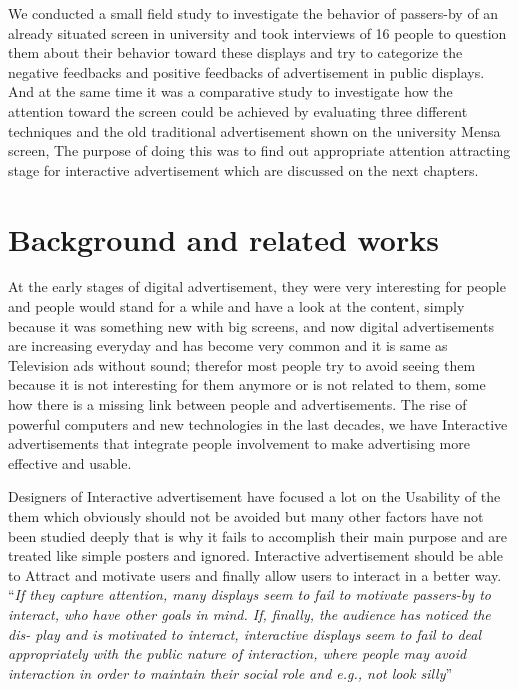 We conducted a small field study to investigate the behavior of passers-by of an already situated screen in university and took interviews of 16 people to question them about their behavior toward these displays and try to categorize the negative feedbacks and positive feedbacks of advertisement in public displays.
And at the same time it was a comparative study to investigate how the attention toward the screen could be achieved by evaluating three different techniques and the old traditional advertisement shown on the university Mensa screen, The purpose of doing this was to find out appropriate attention attracting stage for interactive advertisement which are discussed on the next chapters.





\section{Background and related works}
At the early stages of digital advertisement, they were very interesting for people and people would stand for a while and have a look at the content, simply because it was something new with big screens, and now digital advertisements are increasing everyday and has become very common and it is same as Television ads without sound; therefor most people try to avoid seeing them because it is not interesting for them anymore or is not related to them, some how there is a missing link between people and advertisements. The rise of powerful computers and new technologies in the last decades, we have Interactive advertisements that integrate people involvement to make advertising more effective and usable.

Designers of Interactive advertisement have focused a lot on the Usability of the them which obviously should not be avoided but many other factors have not been studied deeply that is why it fails to accomplish their main purpose and are treated like simple posters and ignored. Interactive advertisement should be able to Attract and motivate users and finally allow users to interact in a better way. ``\emph{If they capture attention, many displays seem to fail to motivate passers-by to interact, who have other goals in mind. If, finally, the audience has noticed the dis- play and is motivated to interact, interactive displays seem to fail to deal appropriately with the public nature of interaction, where people may avoid interaction in order to maintain their social role and e.g., not look silly}''\cite{DesignSpace}


